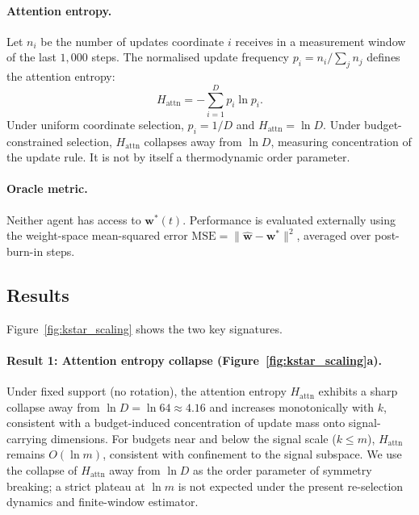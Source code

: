 \documentclass[12pt]{article}
\begin{document}
\paragraph{Attention entropy.}
Let $n_i$ be the number of updates coordinate $i$ receives
in a measurement window of the last $1{,}000$ steps.
The normalised update frequency
$p_i = n_i / \sum_j n_j$ defines the attention entropy:
\begin{equation}
\label{eq:H_attn}
H_{\mathrm{attn}} = -\sum_{i=1}^{D} p_i \ln p_i.
\end{equation}
Under uniform coordinate selection, $p_i = 1/D$ and
$H_{\mathrm{attn}} = \ln D$.  Under budget-constrained
selection, $H_{\mathrm{attn}}$ collapses away from $\ln D$,
measuring concentration of the update rule.  It is not by itself a
thermodynamic order parameter.

\paragraph{Oracle metric.}
Neither agent has access to $\mathbf{w}^*(t)$.
Performance is evaluated externally using the
weight-space mean-squared error
$\mathrm{MSE} = \|\hat{\mathbf{w}} - \mathbf{w}^*\|^2$,
averaged over post-burn-in steps.

\subsection{Results}
\label{subsec:demo_results}

Figure~\ref{fig:kstar_scaling} shows the two key signatures.

\paragraph{Result 1: Attention entropy collapse
(Figure~\ref{fig:kstar_scaling}a).}
Under fixed support (no rotation), the attention entropy
$H_{\mathrm{attn}}$ exhibits a sharp collapse away from
$\ln D = \ln 64 \approx 4.16$ and increases monotonically
with $k$, consistent with a budget-induced concentration
of update mass onto signal-carrying dimensions.
For budgets near and below the signal scale ($k \leq m$),
$H_{\mathrm{attn}}$ remains $O(\ln m)$, consistent with
confinement to the signal subspace.
We use the collapse of $H_{\mathrm{attn}}$ away from
$\ln D$ as the order parameter of symmetry breaking;
a strict plateau at $\ln m$ is not expected under the
present re-selection dynamics and finite-window estimator.
\end{document}
